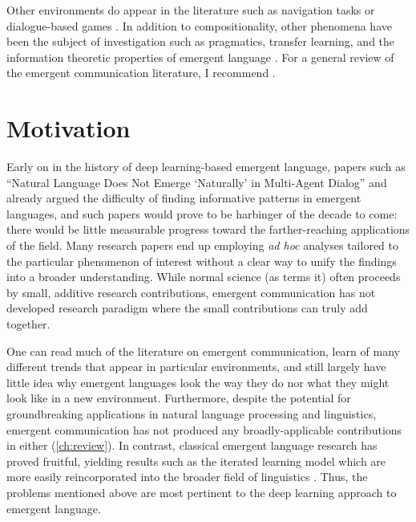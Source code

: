 Other environments do appear in the literature such as navigation tasks or dialogue-based games
  \citep{unger2020GeneralizingEC,brandizzi2022rlupus}.
In addition to compositionality, other phenomena have been the subject of investigation such as pragmatics, transfer learning, and the information theoretic properties of emergent language
  \citep{kang2020incorporatingpragmaticreasoningcommunication,yao2022linking,tucker2021discrete}.
For a general review of the emergent communication literature, I recommend \citet{lazaridou2020review}.

\section{Motivation}
Early on in the history of deep learning-based emergent language, papers such as ``Natural Language Does Not Emerge `Naturally' in Multi-Agent Dialog'' \citep{kottur2017natural} and \citet{bouchacourt2018how} already argued the difficulty of finding informative patterns in emergent languages, and such papers would prove to be harbinger of the decade to come:
  there would be little measurable progress toward the farther-reaching applications of the field.
Many research papers end up employing \emph{ad hoc} analyses tailored to the particular phenomenon of interest without a clear way to unify the findings into a broader understanding.
While normal science (as \citet{kuhn} terms it) often proceeds by small, additive research contributions, emergent communication has not developed research paradigm where the small contributions can truly add together.

One can read much of the literature on emergent communication, learn of many different trends that appear in particular environments, and still largely have little idea why emergent languages look the way they do nor what they might look like in a new environment.
Furthermore, despite the potential for groundbreaking applications in natural language processing and linguistics, emergent communication has not produced any broadly-applicable contributions in either (\cref{ch:review}).
In contrast, classical emergent language research has proved fruitful, yielding results such as the iterated learning model which are more easily reincorporated into the broader field of linguistics \citep{kirby2014iterated}.
Thus, the problems mentioned above are most pertinent to the deep learning approach to emergent language.

